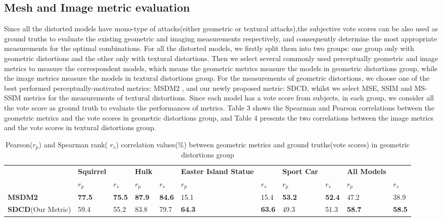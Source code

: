 \subsection{Mesh and  Image metric evaluation}
Since all the distorted models have mono-type of attacks(either geometric or textural attacks),the subjective vote scores can be also used as ground truths to evaluate the existing geometric and imaging measurements respectively, and consequently determine the most appropriate measurements for the optimal combinations. For all the distorted models, we firstly split them into two groups: one group only with geometric distortions and the other only with textural distortions. Then we select several commonly used perceptually geometric and image metrics to measure the correspondent models, which means the geometric metrics measure the models in geometric distortions group, while the image metrics measure the models in textural distortions group. For the measurements of geometric distortions, we choose one of the best performed perceptually-motivated metrics: MSDM2 \cite{Lavou__2011}, and our newly proposed metric: SDCD, whilst we select MSE, SSIM \cite{Wang_2004} and MS-SSIM \cite{Wang} metrics for the measurements of textural distortions.  Since each model has a vote score from subjects, in each group, we consider all the vote score as ground truth to evaluate the performances of metrics.  Table 3 shows the Spearman and Pearson correlations between the geometric metrics and the vote scores in geometric distortions group, and Table 4 presents the two correlations between the image metrics and the vote scores in textural distortions group.\\
\begin{table}[]
\centering
\caption{Pearson($r_p$) and Spearman rank( $r_s$) correlation values(\%) between geometric metrics and ground truths(vote scores) in geometric distortions group}
\label{my-label}
\begin{tabular}{lllllllllll}
                          &  \textbf{Squirrel} & \textbf{} & \textbf{Hulk} & \textbf{} & \textbf{Easter Island Statue} & \textbf{} & \textbf{Sport Car} & \textbf{} & \textbf{All Models} &      \\
                          & $r_p$        & $r_s$        & $r_p$            & $r_s$        & $r_p$               & $r_s$        & $r_p$                & $r_s$       & $r_p$                  & $r_s$   \\
\textbf{MSDM2} \cite{Lavou__2011}            & \textbf{77.5} & \textbf{75.5} & \textbf{87.9} & \textbf{84.6} & 15.1                 & 15.4          & \textbf{53.2} & \textbf{52.4} & 47.2          & 38.9          \\
\textbf{SDCD}(Our Metric) & 59.4          & 55.2          & 83.8          & 79.7          & \textbf{64.3}        & \textbf{63.6} & 49.3          & 51.3          & \textbf{58.7} & \textbf{58.5}
\end{tabular}
\end{table}

